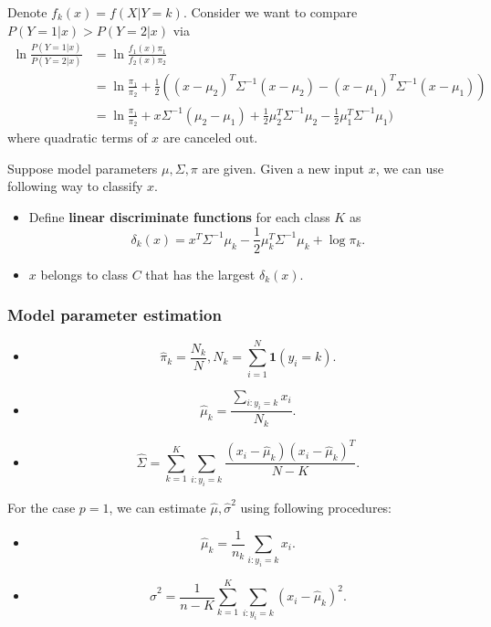 \begin{refsection}
\begin{remark}
Denote $f_k(x) = f(X|Y=k)$.	
	Consider we want to compare $P(Y=1|x) > P(Y=2|x)$ via
	\begin{align*}
	\ln \frac{P(Y=1|x)}{P(Y=2|x)} &= \ln \frac{f_1(x)\pi_1}{f_2(x)\pi_2}\\
	&= \ln \frac{\pi_1}{\pi_2} + \frac{1}{2}((x-\mu_2)^T\Sigma^{-1}(x-\mu_2) - (x-\mu_1)^T\Sigma^{-1}(x-\mu_1)) \\
	&= \ln \frac{\pi_1}{\pi_2} + x\Sigma^{-1}(\mu_2-\mu_1) + \frac{1}{2}\mu_2^T\Sigma^{-1}\mu_2 - \frac{1}{2}\mu_1^T\Sigma^{-1}\mu_1)
	\end{align*}
	where quadratic terms of $x$ are canceled out.
\end{remark}


\begin{method}
Suppose model parameters $\mu, \Sigma, \pi$ are given. Given a new input $x$, we can use following way to classify $x$.
\begin{itemize}
	\item Define \textbf{linear discriminate functions} for each class $K$ as
	$$\delta_k(x) = x^T\Sigma^{-1}\mu_k - \frac{1}{2}\mu_k^T\Sigma^{-1}\mu_k + \log \pi_k.$$
	\item $x$ belongs to class $C$ that has the largest $\delta_k(x)$. 
\end{itemize}
\end{method}


\subsubsection{Model parameter estimation}


\begin{lemma}
\begin{itemize}
	\item $$\hat{\pi}_k = \frac{N_k}{N}, N_k = \sum_{i=1}^N \bm{1}(y_i = k).$$
	\item $$\hat{\mu}_k = \frac{\sum_{i:y_i =k} x_i}{N_k}.$$
	\item $$\hat{\Sigma} = \sum_{k=1}^K\sum_{i:y_i=k}\frac{(x_i - \hat{\mu}_k)(x_i - \hat{\mu}_k)^T}{N-K}.$$
\end{itemize}	
\end{lemma}




\begin{corollary}\cite[108]{murphy2012machine}
	For the case $p = 1$, we can estimate $\hat{\mu}, \hat{\sigma}^2$ using following procedures:
	\begin{itemize}
		\item $$\hat{\mu}_k = \frac{1}{n_k}\sum_{i:y_i =k} x_i.$$ 
		\item $$\hat{\sigma}^2 = \frac{1}{n-K}\sum_{k=1}^K \sum_{i:y_i =k} (x_i - \hat{\mu}_k)^2.$$ 
	\end{itemize}
\end{corollary}



\end{refsection}

